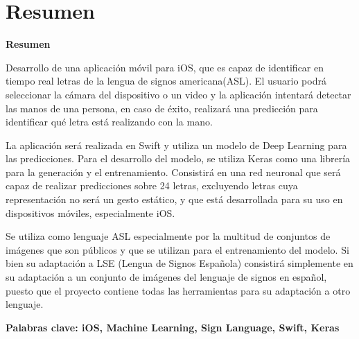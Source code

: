 \documentclass[../main.tex]{subfiles}
\begin{document}
\makeatletter
\renewenvironment{abstract}{%
    \if@twocolumn
      \section*{Resumen \\}%
    \else %
    \begin{flushright}
        {\filleft\Huge\bfseries\fontsize{48pt}{12}\selectfont Resumen\vspace{\z@}}%
        \end{flushright}
      \quotation
    \fi}
    {\if@twocolumn\else\endquotation\fi}
\makeatother
\makeatletter
\renewenvironment{abstract}{%
    \if@twocolumn
      \section*{Resumen \\}%
    \else %
    \begin{flushright}
        {\filleft\Huge\bfseries\fontsize{48pt}{12}\selectfont Resumen\vspace{\z@}}%
        \end{flushright}
      \quotation
    \fi}
    {\if@twocolumn\else\endquotation\fi}
\makeatother
\begin{abstract}
Desarrollo de una aplicación móvil para iOS, que es capaz de identificar en tiempo real letras de la lengua de signos americana(ASL). El usuario podrá seleccionar la cámara del dispositivo o un video y la aplicación intentará detectar las manos de una persona, en caso de éxito, realizará una predicción para identificar qué letra está realizando con la mano.

La aplicación será realizada en Swift y utiliza un modelo de Deep Learning para las predicciones. Para el desarrollo del modelo, se utiliza Keras como una librería para la generación y el entrenamiento. Consistirá en una red neuronal que será capaz de realizar predicciones sobre 24 letras, excluyendo letras cuya representación no será un gesto estático, y que está desarrollada para su uso en dispositivos móviles, especialmente iOS.

Se utiliza como lenguaje ASL especialmente por la multitud de conjuntos de imágenes que son públicos y que se utilizan para el entrenamiento del modelo. Si bien su adaptación a LSE (Lengua de Signos Española) consistirá simplemente en su adaptación a un conjunto de imágenes del lenguaje de signos en español, puesto que el proyecto contiene todas las herramientas para su adaptación a otro lenguaje.

\bfseries{\large{Palabras clave:}} iOS, Machine Learning, Sign Language, Swift, Keras 

\end{abstract}
\end{document}
